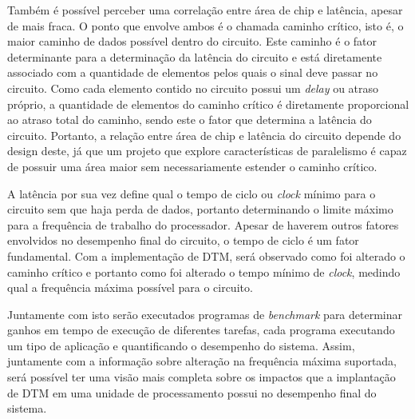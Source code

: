 Também é possível perceber uma correlação entre área de chip e latência, apesar de mais fraca. O ponto que envolve ambos é o chamada caminho crítico, isto é, o maior caminho de dados possível dentro do circuito. Este caminho é o fator determinante para a determinação da latência do circuito e está diretamente associado com a quantidade de elementos pelos quais o sinal deve passar no circuito. Como cada elemento contido no circuito possui um \textit{delay} ou atraso próprio, a quantidade de elementos do caminho crítico é diretamente proporcional ao atraso total do caminho, sendo este o fator que determina a latência do circuito. Portanto, a relação entre área de chip e latência do circuito depende do design deste, já que um projeto que explore características de paralelismo é capaz de possuir uma área maior sem necessariamente estender o caminho crítico.

A latência por sua vez define qual o tempo de ciclo ou \textit{clock} mínimo para o circuito sem que haja perda de dados, portanto determinando o limite máximo para a frequência de trabalho do processador. Apesar de haverem outros fatores envolvidos no desempenho final do circuito, o tempo de ciclo é um fator fundamental. Com a implementação de DTM, será observado como foi alterado o caminho crítico e portanto como foi alterado o tempo mínimo de \textit{clock}, medindo qual a frequência máxima possível para o circuito.

Juntamente com isto serão executados programas de \textit{benchmark} para determinar ganhos em tempo de execução de diferentes tarefas, cada programa executando um tipo de aplicação e quantificando o desempenho do sistema. Assim, juntamente com a informação sobre alteração na frequência máxima suportada, será possível ter uma visão mais completa sobre os impactos que a implantação de DTM em uma unidade de processamento possui no desempenho final do sistema.




